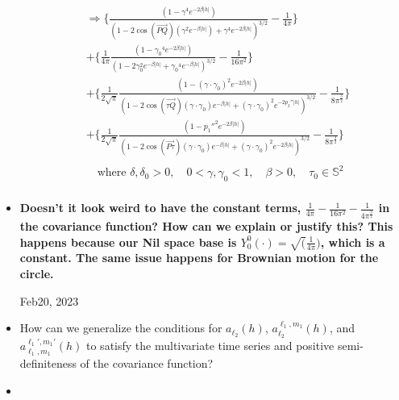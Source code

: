 \documentclass[11pt]{article}
\begin{document}
\begin{itemize}
\begin{align*}
\\
&\Rightarrow \biggl\{ \frac{(1 - {\gamma}^4 e^{-2 \beta \lvert h \lvert})}{(1-2 \cos{(\overrightarrow{PQ})} (\gamma^2 e^{-\beta \lvert h \lvert}) + {\gamma}^4 e^{-2 \beta \lvert h \lvert})^{3/2}} - \frac{1}{4\pi} \biggl\}\\
&+ \biggl\{ \frac{1}{4\pi}\frac{(1 - {\gamma_0}^4 e^{-2 \beta \lvert h \lvert})}{(1-2 \gamma_0^2 e^{- \beta \lvert h \lvert} + {\gamma_0}^4 e^{-\beta \lvert h \lvert})^{3/2}}  - \frac{1}{16\pi^2} \biggl\}\\ 
&+ \biggl\{ \frac{1}{2\sqrt{\pi}}\frac{(1 - {(\gamma \cdot \gamma_0)}^2 e^{-2 \beta \lvert h \lvert})}{(1-2 \cos{(\overrightarrow{\tau Q})} (\gamma \cdot \gamma_0) e^{-\beta \lvert h \lvert} + {(\gamma \cdot \gamma_0)}^2 e^{-2p_2'' \lvert h \lvert})^{3/2}} - \frac{1}{8\pi^\frac{3}{2}} \biggl\}\\
& + \biggl\{ \frac{1}{2\sqrt{\pi}} \frac{(1 - {p_1''}^2 e^{-2 \beta \lvert h \lvert})}{(1-2 \cos{(\overrightarrow{P \tau})} (\gamma \cdot \gamma_0) e^{-\beta \lvert h \lvert} + {(\gamma \cdot \gamma_0)}^2 e^{-2 \beta \lvert h \lvert})^{3/2}} - \frac{1}{8\pi^\frac{3}{2}} \biggl\}\\
\\
&\quad \text{where } \delta, \delta_{0}>0, \quad 0<\gamma, \gamma_{0} < 1, \quad \beta >0, \quad \tau_{0} \in \mathbb{S}^2 \\
\end{align*}

\item
\textbf{{\color{red} Doesn't it look weird to have the constant terms, $\frac{1}{4\pi} - \frac{1}{16\pi^2} - \frac{1}{4\pi^\frac{3}{2}}$ in the covariance function? How can we explain or justify this? This happens because our Nil space base is $Y_0^0(\cdot)=\sqrt(\frac{1}{4\pi})$, which is a constant. The same issue happens for Brownian motion for the circle.}}\\

\pagebreak

Feb20, 2023\\

\item How can we generalize the conditions for $a_{\ell_2}(h)$, $a_{\ell_2}^{\ell_1,m_1}(h)$, and $a_{\ell_1,m_1}^{\ell_1',m_1'}(h)$ to satisfy the multivariate time series and positive semi-definiteness of the covariance function?\\ 

\item


\end{itemize}
\end{document}
